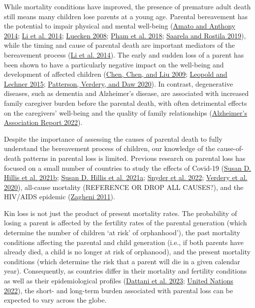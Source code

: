 \documentclass[
  11pt,
  letterpaper,
]{article}
\begin{document}
While mortality conditions have improved, the presence of premature adult death still means many children lose parents at a young age. Parental bereavement has the potential to impair physical and mental well-being (\protect\hyperlink{ref-amato2014death}{Amato and Anthony 2014}; \protect\hyperlink{ref-li2014mortality}{Li et al. 2014}; \protect\hyperlink{ref-luecken2008parental}{Luecken 2008}; \protect\hyperlink{ref-pham2018burden}{Pham et al. 2018}; \protect\hyperlink{ref-saarela2018mortality}{Saarela and Rostila 2019}), while the timing and cause of parental death are important mediators of the bereavement process (\protect\hyperlink{ref-li2014mortality}{Li et al. 2014}). The early and sudden loss of a parent has been shown to have a particularly negative impact on the well-being and development of affected children (\protect\hyperlink{ref-chen2009education}{Chen, Chen, and Liu 2009}; \protect\hyperlink{ref-leopold2015bereavement}{Leopold and Lechner 2015}; \protect\hyperlink{ref-patterson2020linked}{Patterson, Verdery, and Daw 2020}). In contrast, degenerative diseases, such as dementia and Alzheimer's disease, are associated with increased family caregiver burden before the parental death, with often detrimental effects on the caregivers' well-being and the quality of family relationships (\protect\hyperlink{ref-alzheimers2022}{Alzheimer's Association Report 2022}).

Despite the importance of assessing the causes of parental death to fully understand the bereavement process of children, our knowledge of the cause-of-death patterns in parental loss is limited. Previous research on parental loss has focused on a small number of countries to study the effects of Covid-19 (\protect\hyperlink{ref-hillis2021global}{Susan D. Hillis et al. 2021b}; \protect\hyperlink{ref-hillis2021us}{Susan D. Hillis et al. 2021a}; \protect\hyperlink{ref-snyder2022covid}{Snyder et al. 2022}; \protect\hyperlink{ref-verdery2020covid}{Verdery et al. 2020}), all-cause mortality (REFERENCE OR DROP ALL CAUSES?), and the HIV/AIDS epidemic (\protect\hyperlink{ref-zagheni2011impact}{Zagheni 2011}).

Kin loss is not just the product of present mortality rates. The probability of losing a parent is affected by the fertility rates of the parental generation (which determine the number of children `at risk' of orphanhood'), the past mortality conditions affecting the parental and child generation (i.e., if both parents have already died, a child is no longer at risk of orphanood), and the present mortality conditions (which determine the risk that a parent will die in a given calendar year). Consequently, as countries differ in their mortality and fertility conditions as well as their epidemiological profiles (\protect\hyperlink{ref-owid-causes-of-death}{Dattani et al. 2023}; \protect\hyperlink{ref-united2022world}{United Nations 2022}), the short- and long-term burden associated with parental loss can be expected to vary across the globe.
\end{document}
